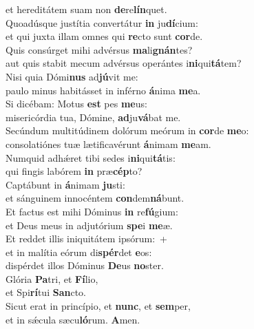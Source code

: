 \evenverse et hereditátem suam non \textbf{de}re\textbf{lín}quet.\\
\oddverse Quoadúsque justítia convertátur \textbf{in} ju\textbf{dí}cium:~\*\\
\oddverse et qui juxta illam omnes qui \textbf{re}cto sunt \textbf{cor}de.\\
\evenverse Quis consúrget mihi advérsus \textbf{ma}li\textbf{gnán}tes?~\*\\
\evenverse aut quis stabit mecum advérsus operántes i\textbf{ni}qui\textbf{tá}tem?\\
\oddverse Nisi quia Dómi\textbf{nus} ad\textbf{jú}vit me:~\*\\
\oddverse paulo minus habitásset in inférno \textbf{á}nima \textbf{me}a.\\
\evenverse Si dicébam: Motus \textbf{est} pes \textbf{me}us:~\*\\
\evenverse misericórdia tua, Dómine, \textbf{ad}ju\textbf{vá}bat me.\\
\oddverse Secúndum multitúdinem dolórum meórum in \textbf{cor}de \textbf{me}o:~\*\\
\oddverse consolatiónes tuæ lætificavérunt \textbf{á}nimam \textbf{me}am.\\
\evenverse Numquid adhǽret tibi sedes i\textbf{ni}qui\textbf{tá}tis:~\*\\
\evenverse qui fingis labórem \textbf{in} præ\textbf{cép}to?\\
\oddverse Captábunt in \textbf{á}nimam \textbf{ju}sti:~\*\\
\oddverse et sánguinem innocéntem \textbf{con}dem\textbf{ná}bunt.\\
\evenverse Et factus est mihi Dóminus \textbf{in} re\textbf{fú}gium:~\*\\
\evenverse et Deus meus in adjutórium \textbf{spe}i \textbf{me}æ.\\
\oddverse Et reddet illis iniquitátem ipsórum:~+\\
\oddverse  et in malítia eórum di\textbf{spér}det \textbf{e}os:~\*\\
\oddverse dispérdet illos Dóminus \textbf{De}us \textbf{no}ster.\\
\evenverse Glória \textbf{Pa}tri, et \textbf{Fí}lio,~\*\\
\evenverse et Spi\textbf{rí}tui \textbf{San}cto.\\
\oddverse Sicut erat in princípio, et \textbf{nunc}, et \textbf{sem}per,~\*\\
\oddverse et in sǽcula sæcu\textbf{ló}rum. \textbf{A}men.\\
